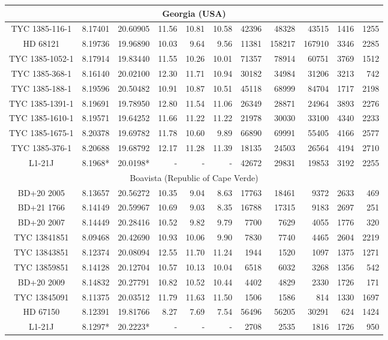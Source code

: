 \begin{table*}
{\begin{tabular}{c|cc|rrr|rrr|rr}
\hline
\multicolumn{11}{c}{Georgia (USA)}\\
\hline
TYC 1385-116-1 & 8.17401 & 20.60905 & 11.56 & 10.81 & 10.58 & 42396 & 48328 & 43515 & 1416 & 1255\\
HD 68121 & 8.19736 & 19.96890 & 10.03 & 9.64 & 9.56 & 11381 & 158217 & 167910 & 3346 & 2285\\
TYC 1385-1052-1 & 8.17914 & 19.83440 & 11.55 & 10.26 & 10.01 & 71357 & 78914 & 60751 & 3769 & 1512\\
TYC 1385-368-1 & 8.16140 & 20.02100 & 12.30 & 11.71 & 10.94 & 30182 & 34984 & 31206 & 3213 & 742\\
TYC 1385-188-1 & 8.19596 & 20.50482 & 10.91 & 10.87 & 10.51 & 45118 & 68999 & 84704 & 1717 & 2198\\
TYC 1385-1391-1 & 8.19691 & 19.78950 & 12.80 & 11.54 & 11.06 & 26349 & 28871 & 24964 & 3893 & 2276\\
TYC 1385-1610-1 & 8.19571 & 19.64252 & 11.66 & 11.22 & 11.22 & 21978 & 30030 & 33100 & 4340 & 2233\\
TYC 1385-1675-1 & 8.20378 & 19.69782 & 11.78 & 10.60 & 9.89 & 66890 & 69991 & 55405 & 4166 & 2577\\
TYC 1385-376-1 & 8.20688 & 19.68792 & 12.17 & 11.28 & 11.39 & 18135 & 24503 & 26564 & 4194 & 2710\\
L1-21J & 8.1968* & 20.0198* & - & - & - & 42672 & 29831 & 19853 & 3192 & 2255\\

\hline
\multicolumn{11}{c}{Boavista (Republic of Cape Verde)}\\
\hline
BD+20 2005 & 8.13657 & 20.56272 & 10.35 & 9.04 & 8.63 & 17763 & 18461 & 9372 & 2633 & 469\\
BD+21 1766 & 8.14149 & 20.59967 & 10.69 & 9.03 & 8.35 & 16788 & 17315 & 9183 & 2697 & 251\\
BD+20 2007 & 8.14449 & 20.28416 & 10.52 & 9.82 & 9.79 & 7700 & 7629 & 4055 & 1776 & 320\\
TYC 13841851 & 8.09468 & 20.42690 & 10.93 & 10.06 & 9.90 & 7830 & 7740 & 4465 & 2604 & 2219\\
TYC 13843851 & 8.12374 & 20.08094 & 12.55 & 11.70 & 11.24 & 1944 & 1520 & 1097 & 1375 & 1271\\
TYC 13859851 & 8.14128 & 20.12704 & 10.57 & 10.13 & 10.04 & 6518 & 6032 & 3268 & 1356 & 542\\
BD+20 2009 & 8.14832 & 20.27791 & 10.82 & 10.52 & 10.44 & 4402 & 4829 & 2330 & 1726 & 171\\
TYC 13845091 & 8.11375 & 20.03512 & 11.79 & 11.63 & 11.50 & 1506 & 1586 & 814 & 1330 & 1697\\
HD 67150 & 8.12391 & 19.81766 & 8.27 & 7.69 & 7.54 & 56496 & 56205 & 30291 & 624 & 1424\\
L1-21J & 8.1297* & 20.2223* & - & - & - & 2708 & 2535 & 1816 & 1726 & 950\\


\end{tabular}}
\end{table*}
